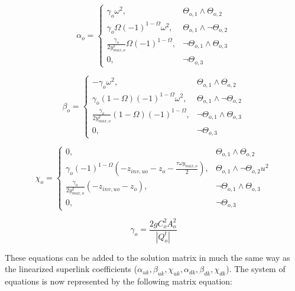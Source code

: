 \documentclass[11pt]{article}
\begin{document}
\begin{equation}
  \boxed{
  \alpha_{o} =
  \begin{cases}
   \gamma_o \omega^2, & \Theta_{o,1} \land \Theta_{o,2}\\
   \gamma_o \Omega (-1)^{1 - \Omega} \omega^2, & \Theta_{o,1} \land \lnot \Theta_{o,2}\\
   \frac{\gamma_o}{2 y_{max,o}^2} \Omega (-1)^{1 - \Omega}, & \lnot \Theta_{o,1} \land \Theta_{o,3} \\
   0, & \lnot \Theta_{o,3}
  \end{cases}
  }
\end{equation}

\begin{equation}
  \boxed{
  \beta_{o} =
  \begin{cases}
   -\gamma_o \omega^2, & \Theta_{o,1} \land \Theta_{o,2}\\
   \gamma_o (1 - \Omega) (-1)^{1 - \Omega} \omega^2, & \Theta_{o,1} \land \lnot \Theta_{o,2}\\
   \frac{\gamma_o}{2 y_{max,o}^2} (1 - \Omega) (-1)^{1 - \Omega}, & \lnot \Theta_{o,1} \land \Theta_{o,3} \\
   0, & \lnot \Theta_{o,3}
  \end{cases}
  }
\end{equation}

\begin{equation}
  \boxed{
  \chi_{o} =
  \begin{cases}
   0, & \Theta_{o,1} \land \Theta_{o,2}\\
   \gamma_o (-1)^{1 - \Omega} (- z_{inv,uo} - z_o - \frac{\tau \omega y_{max,o}}{2}), & \Theta_{o,1} \land \lnot \Theta_{o,2} u^2\\
   \frac{\gamma_o}{2 y_{max,o}^2} (- z_{inv,uo} - z_o), & \lnot \Theta_{o,1} \land \Theta_{o,3} \\
   0, & \lnot \Theta_{o,3}
  \end{cases}
  }
\end{equation}

\begin{equation}
  \boxed{
 \gamma_o = \frac{2 g C_o^2 A_o^2}{|Q_o^t|} 
 }
\end{equation}

These equations can be added to the solution matrix in much the same way as the
linearized superlink coefficients ($\alpha_{uk}, \beta_{uk}, \chi_{uk},
\alpha_{dk}, \beta_{dk}, \chi_{dk}$). The system of equations is now represented
by the following matrix equation:
\end{document}
